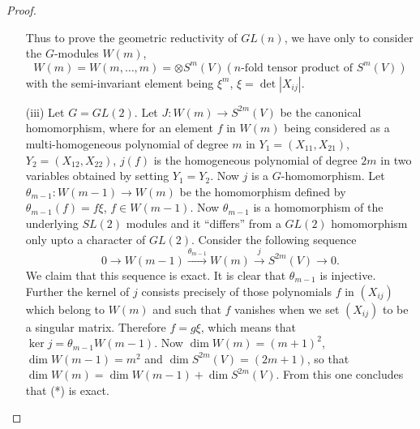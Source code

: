 \begin{proof}
\begin{itemize}
Thus to prove the geometric reductivity of $GL(n)$, we have only to consider the $G$-modules $W(m)$,
$$
W(m)=W(m,\ldots,m)=\otimes S^{m}(V)(n\text{-fold tensor product of } S^{m}(V))
$$
with the semi-invariant element being $\xi^{m}$, $\xi=\det |X_{ij}|$.

\item[(iii)] Let $G=GL(2)$. Let $J:W(m)\to S^{2m}(V)$ be the canonical homomorphism, where for an element $f$ in $W(m)$ being considered as a multi-homogeneous polynomial of degree $m$ in $Y_{1}=(X_{11},X_{21})$, $Y_{2}=(X_{12},X_{22})$, $j(f)$ is the homogeneous polynomial of degree $2m$ in two variables obtained by setting $Y_{1}=Y_{2}$. Now $j$ is a $G$-homomorphism. Let $\theta_{m-1}:W(m-1)\to W(m)$ be the homomorphism defined by $\theta_{m-1}(f)=f\xi$, $f\in W(m-1)$. Now $\theta_{m-1}$ is a homomorphism of the underlying $SL(2)$ modules and it ``differs'' from a $GL(2)$ homomorphism only upto a character of $GL(2)$. Consider the following sequence
\begin{equation*}
0\to W(m-1)\xrightarrow{\theta_{m-1}}W(m)\xrightarrow{j}S^{2m}(V)\to 0.\tag{*}
\end{equation*}
We claim that this sequence is exact. It is clear that $\theta_{m-1}$ is injective. Further the kernel of $j$ consists precisely of those polynomials $f$ in $(X_{ij})$ which belong to $W(m)$ and such that $f$ vanishes when we set $(X_{ij})$ to be a singular matrix. Therefore $f=g\xi$, which means that $\ker j=\theta_{m-1}W(m-1)$. Now $\dim W(m)=(m+1)^{2}$, $\dim W(m-1)=m^{2}$ and $\dim S^{2m}(V)=(2m+1)$, so that $\dim W(m)=\dim W(m-1)+\dim S^{2m}(V)$. From this one concludes that (*) is exact.


\end{itemize}
\end{proof}
